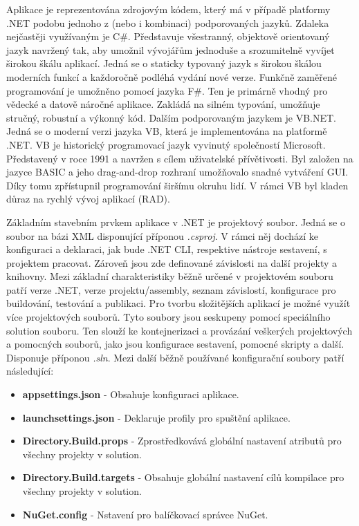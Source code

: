 Aplikace je reprezentována zdrojovým kódem, který má v případě platformy .NET podobu jednoho z (nebo i kombinaci) podporovaných jazyků. Zdaleka nejčastěji využívaným je C\#. Představuje všestranný, objektově orientovaný jazyk navržený tak, aby umožnil vývojářům jednoduše a srozumitelně vyvíjet širokou škálu aplikací. \cite{Price2023c8} Jedná se o staticky typovaný jazyk s širokou škálou moderních funkcí a každoročně podléhá vydání nové verze. Funkčně zaměřené programování je umožněno pomocí jazyka F\#. Ten je primárně vhodný pro vědecké a datově náročné aplikace. \cite{Price2023c8} Zakládá na silném typování, umožňuje stručný, robustní a výkonný kód. Dalším podporovaným jazykem je VB.NET. Jedná se o moderní verzi jazyka VB, která je implementována na platformě .NET. VB je historický programovací jazyk vyvinutý společností Microsoft. Představený v roce 1991 a navržen s cílem uživatelské přívětivosti. Byl založen na jazyce BASIC a jeho drag-and-drop rozhraní umožňovalo snadné vytváření GUI. Díky tomu zpřístupnil programování širšímu okruhu lidí. V rámci VB byl kladen důraz na rychlý vývoj aplikací (RAD).


Základním stavebním prvkem aplikace v .NET je projektový soubor. Jedná se o soubor na bázi XML disponující příponou \emph{.csproj}. V rámci něj dochází ke konfiguraci a deklaraci, jak bude .NET CLI, respektive nástroje sestavení, s projektem pracovat. Zároveň jsou zde definované závislosti na další projekty a knihovny. \cite{Alls2023} Mezi základní charakteristiky běžně určené v projektovém souboru patří verze .NET, verze projektu/assembly, seznam závislostí, konfigurace pro buildování, testování a publikaci. Pro tvorbu složitějších aplikací je možné využít více projektových souborů. Tyto soubory jsou seskupeny pomocí speciálního solution souboru. Ten slouží ke kontejnerizaci a provázání veškerých projektových a pomocných souborů, jako jsou konfigurace sestavení, pomocné skripty a další. Disponuje příponou \emph{.sln}. Mezi další běžně používané konfigurační soubory patří následující:

\begin{itemize}
    \item \textbf{appsettings.json} - Obsahuje konfiguraci aplikace.
    \item \textbf{launchsettings.json} - Deklaruje profily pro spuštění aplikace.
    \item \textbf{Directory.Build.props} - Zprostředkovává globální nastavení atributů pro všechny projekty v solution.
    \item \textbf{Directory.Build.targets} - Obsahuje globální nastavení cílů kompilace pro všechny projekty v solution.
    \item \textbf{NuGet.config} - Nstavení pro balíčkovací správce NuGet.
\end{itemize}

